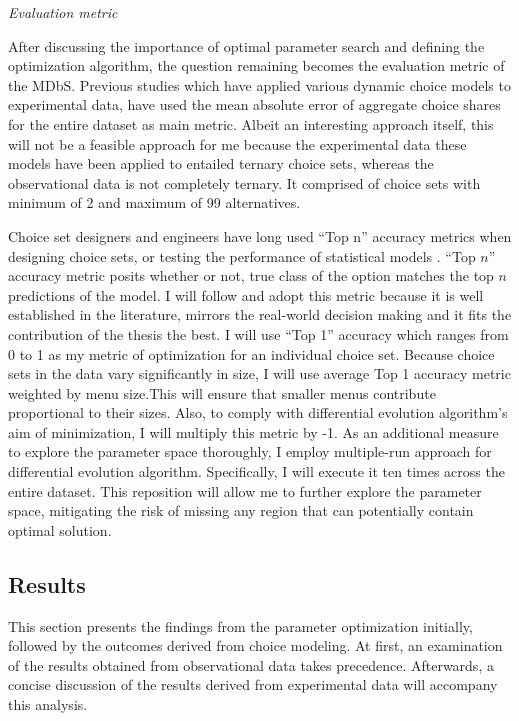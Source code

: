 \documentclass[a4paper,12pt]{article}
\begin{document}
\textit{Evaluation metric}

After discussing the importance of optimal parameter search and defining the optimization algorithm, the question remaining becomes the evaluation metric of the MDbS. Previous studies which have applied various dynamic choice models to experimental data, have used the mean absolute error of aggregate choice shares for the entire dataset as main metric. Albeit an interesting approach itself, this will not be a feasible approach for me because the experimental data these models have been applied to entailed ternary choice sets, whereas the observational data is not completely ternary. It comprised of choice sets with minimum of 2 and maximum of 99 alternatives. 

Choice set designers and engineers have long used ``Top n'' accuracy metrics when designing choice sets, or testing the performance of statistical models \citep{ricci2015recommender}. ``Top $n$'' accuracy metric posits whether or not, true class of the option matches the top $n$ predictions of the model. I will follow and adopt this metric because it is well established in the literature, mirrors the real-world decision making and it fits the contribution of the thesis the best. I will use ``Top 1'' accuracy which ranges from 0 to 1 as my metric of optimization for an individual choice set. Because choice sets in the data vary significantly in size, I will use average Top 1 accuracy metric weighted by menu size.This will ensure that smaller menus contribute proportional to their sizes. Also, to comply with differential evolution algorithm's aim of minimization, I will multiply this metric by -1. As an additional measure to explore the parameter space thoroughly, I employ multiple-run approach for differential evolution algorithm. Specifically, I will execute it ten times across the entire dataset. This reposition will allow me to further explore the parameter space, mitigating the risk of missing any region that can potentially contain optimal solution.


\subsection{Results}

This section presents the findings from the parameter optimization initially, followed by the outcomes derived from choice modeling. At first, an examination of the results obtained from observational data takes precedence. Afterwards, a concise discussion of the results derived from experimental data will accompany this analysis.
\end{document}
